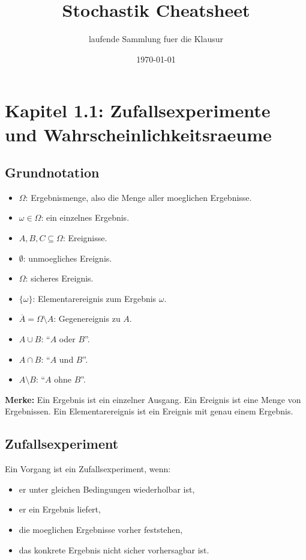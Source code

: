 \documentclass[a4paper,11pt]{article}
\title{Stochastik Cheatsheet}
\author{laufende Sammlung fuer die Klausur}
\date{\today}
\begin{document}
\maketitle
\tableofcontents
\bigskip

\section{Kapitel 1.1: Zufallsexperimente und Wahrscheinlichkeitsraeume}

\subsection{Grundnotation}
\begin{itemize}
  \item $\Omega$: Ergebnismenge, also die Menge aller moeglichen Ergebnisse.
  \item $\omega \in \Omega$: ein einzelnes Ergebnis.
  \item $A, B, C \subseteq \Omega$: Ereignisse.
  \item $\emptyset$: unmoegliches Ereignis.
  \item $\Omega$: sicheres Ereignis.
  \item $\{\omega\}$: Elementarereignis zum Ergebnis $\omega$.
  \item $\overline{A} = \Omega \setminus A$: Gegenereignis zu $A$.
  \item $A \cup B$: ``$A$ oder $B$''.
  \item $A \cap B$: ``$A$ und $B$''.
  \item $A \setminus B$: ``$A$ ohne $B$''.
\end{itemize}

\textbf{Merke:}
Ein Ergebnis ist ein einzelner Ausgang. Ein Ereignis ist eine Menge von Ergebnissen. Ein Elementarereignis ist ein Ereignis mit genau einem Ergebnis.

\subsection{Zufallsexperiment}
Ein Vorgang ist ein Zufallsexperiment, wenn:
\begin{itemize}
  \item er unter gleichen Bedingungen wiederholbar ist,
  \item er ein Ergebnis liefert,
  \item die moeglichen Ergebnisse vorher feststehen,
  \item das konkrete Ergebnis nicht sicher vorhersagbar ist.
\end{itemize}
\end{document}

